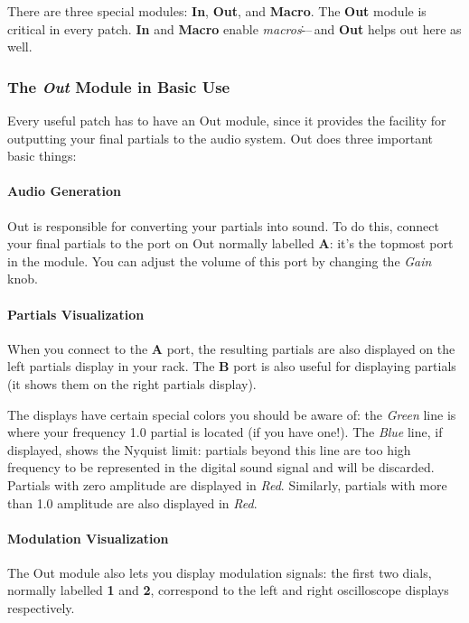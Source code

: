 \documentclass{article}
\begin{document}

There are three special modules: {\bf In}, {\bf Out}, and {\bf Macro}.  The {\bf Out} module is critical in every patch.  {\bf In} and {\bf Macro} enable {\it macros}\.---\,and {\bf Out} helps out here as well.

\subsubsection{The \textit{Out} Module in Basic Use}  
\label{outmodule}

Every useful patch has to have an Out module, since it provides the facility for outputting your final partials to the audio system.  Out does three important basic things:

\paragraph{Audio Generation}  Out is responsible for converting your partials into sound.  To do this, connect your final partials to the port on Out normally labelled {\bf A}: it's the topmost port in the module.  You can adjust the volume of this port by changing the {\it Gain} knob.  

\paragraph{Partials Visualization}  When you connect to the {\bf A} port, the resulting partials are also displayed on the left partials display in your rack.  The {\bf B} port is also useful for displaying partials (it shows them on the right partials display).  

The displays have certain special colors you should be aware of: the {\it Green} line is where your frequency 1.0 partial is located (if you have one!).  The {\it Blue} line, if displayed, shows the Nyquist limit: partials beyond this line are too high frequency to be represented in the digital sound signal and will be discarded.  Partials with zero amplitude are displayed in {\it Red}.  Similarly, partials with more than 1.0 amplitude are also displayed in {\it Red}.

\paragraph{Modulation Visualization} The Out module also lets you display modulation signals: the first two dials, normally labelled {\bf 1} and {\bf 2}, correspond to the left and right oscilloscope displays respectively.
\end{document}
